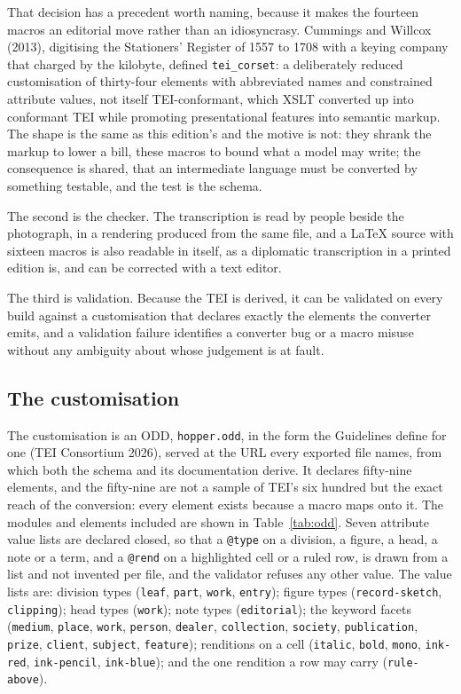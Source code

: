 \documentclass[11pt]{article}
\begin{document}
That decision has a precedent worth naming, because it makes the fourteen
macros an editorial move rather than an idiosyncrasy. Cummings and Willcox
(2013), digitising the Stationers' Register of 1557 to 1708 with a keying
company that charged by the kilobyte, defined \texttt{tei\_corset}: a
deliberately reduced customisation of thirty-four elements with abbreviated
names and constrained attribute values, not itself TEI-conformant, which XSLT
converted up into conformant TEI while promoting presentational features into
semantic markup. The shape is the same as this edition's and the motive is not: they shrank
the markup to lower a bill, these macros to bound what a model may write; the
consequence is shared, that an intermediate language must be converted by
something testable, and the test is the schema.

The second is the checker. The transcription is read by people beside the photograph, in a rendering produced from the same file, and a LaTeX source with sixteen macros is also readable in itself, as a diplomatic transcription in a printed edition is, and can be corrected with a text editor.

The third is validation. Because the TEI is derived, it can be validated on every build against a customisation that declares exactly the elements the converter emits, and a validation failure identifies a converter bug or a macro misuse without any ambiguity about whose judgement is at fault.

\subsection{The customisation}

The customisation is an ODD, \texttt{hopper.odd}, in the form the Guidelines define for one (TEI Consortium 2026), served at the URL every exported file names, from which both the schema and its documentation derive. It declares fifty-nine elements, and the fifty-nine are not a sample of TEI's six hundred but the exact reach of the conversion: every element exists because a macro maps onto it. The modules and elements included are shown in Table~\ref{tab:odd}. Seven attribute value lists are declared closed, so that a \texttt{@type} on a division, a figure, a head, a note or a term, and a \texttt{@rend} on a highlighted cell or a ruled row, is drawn from a list and not invented per file, and the validator refuses any other value. The value lists are: division types (\texttt{leaf}, \texttt{part}, \texttt{work}, \texttt{entry}); figure types (\texttt{record-sketch}, \texttt{clipping}); head types (\texttt{work}); note types (\texttt{editorial}); the keyword facets (\texttt{medium}, \texttt{place}, \texttt{work}, \texttt{person}, \texttt{dealer}, \texttt{collection}, \texttt{society}, \texttt{publication}, \texttt{prize}, \texttt{client}, \texttt{subject}, \texttt{feature}); renditions on a cell (\texttt{italic}, \texttt{bold}, \texttt{mono}, \texttt{ink-red}, \texttt{ink-pencil}, \texttt{ink-blue}); and the one rendition a row may carry (\texttt{rule-above}).
\end{document}
